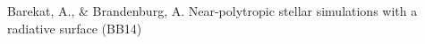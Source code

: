 \documentclass[twocolumn]{article}
\begin{document}


\begin{thebibliography}{}

Barekat, A., \& Brandenburg, A.
{Near-polytropic stellar simulations with a radiative surface}
(BB14)

\end{thebibliography}

\end{document}

